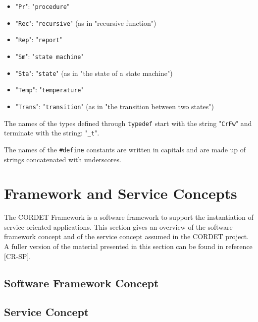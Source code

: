 \documentclass{pnp_article}
\begin{document}
\begin{itemize}
\item "\texttt{Pr}": "\texttt{procedure}"
\item "\texttt{Rec}": "\texttt{recursive}" (as in "recursive function")
\item "\texttt{Rep}": "\texttt{report}"
\item "\texttt{Sm}": "\texttt{state machine}"
\item "\texttt{Sta}": "\texttt{state}" (as in "the state of a state machine")
\item "\texttt{Temp}": "\texttt{temperature}"
\item "\texttt{Trans}": "\texttt{transition}" (as in "the transition between two states")
\end{itemize}

The names of the types defined through \texttt{typedef} start with the string "\texttt{CrFw}" and 
terminate with the string: "\texttt{\_t}".

The names of the \texttt{\#define} constants are written in capitals and are made 
up of strings concatenated with underscores.

\section{Framework and Service Concepts}
The CORDET Framework is a software framework to support the instantiation of service-oriented applications. 
This section gives an overview of the software framework concept and of the service concept assumed in the CORDET project.
A fuller version of the material presented in this section can be found in reference [CR-SP].

\subsection{Software Framework Concept}\label{sec:SwFwConcept} 


\subsection{Service Concept}\label{sec:ServConcept} 


\end{document}
